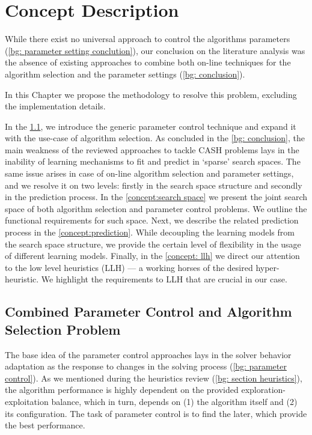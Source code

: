 \chapter{Concept Description}\label{Concept description}
While there exist no universal approach to control the algorithms parameters (\cref{bg: parameter setting conclution}), our conclusion on the literature analysis was the absence of existing approaches to combine both on-line techniques for the algorithm selection and the parameter settings (\cref{bg: conclusion}). 

In this Chapter we propose the methodology to resolve this problem, excluding the implementation details.

In the \cref{concept:parameter control}, we introduce the generic parameter control technique and expand it with the use-case of algorithm selection. As concluded in the \cref{bg: conclusion}, the main weakness of the reviewed approaches to tackle CASH problems lays in the inability of learning mechanisms to fit and predict in `sparse' search spaces. The same issue arises in case of on-line algorithm selection and parameter settings, and we resolve it on two levels: firstly in the search space structure and secondly in the prediction process. In the \cref{concept:search space} we present the joint search space of both algorithm selection and parameter control problems. We outline the functional requirements for such space. Next, we describe the related prediction process in the \cref{concept:prediction}. While decoupling the learning models from the search space structure, we provide the certain level of flexibility in the usage of different learning models.
Finally, in the \cref{concept: llh} we direct our attention to the low level heuristics (LLH) — a working horses of the desired hyper-heuristic. We highlight the requirements to LLH that are crucial in our case.


\section{Combined Parameter Control and Algorithm Selection Problem}\label{concept:parameter control}
The base idea of the parameter control approaches lays in the solver behavior adaptation as the response to changes in the solving process (\cref{bg: parameter control}). As we mentioned during the heuristics review (\cref{bg: section heuristics}), the algorithm performance is highly dependent on the provided exploration-exploitation balance, which in turn, depends on (1) the algorithm itself and (2) its configuration. The task of parameter control is to find the later, which provide the best performance.

